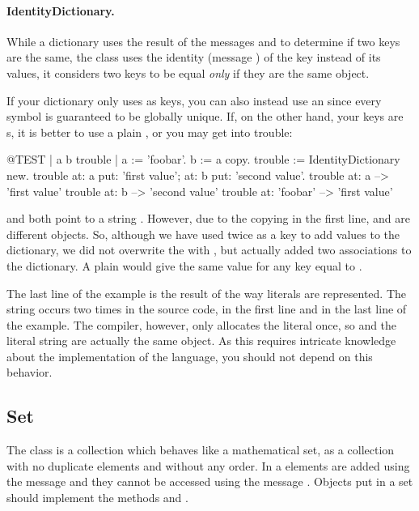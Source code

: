 \documentclass[a4paper,10pt,twoside]{book}
\begin{document}
\paragraph{IdentityDictionary.}
While a dictionary uses the result of the messages \ct{=} and  to determine if two keys are the same, the class  uses the identity (message ) of the key instead of its values, \ie it considers two keys to be equal \emph{only} if they are the same object.

If your dictionary only uses  as keys, you can also instead use an  since every symbol is guaranteed to be globally unique.
If, on the other hand, your keys are s, it is better to use a plain , or you may get into trouble:

\begin{code}{@TEST | a b trouble |}
a := 'foobar'.
b := a copy.
trouble := IdentityDictionary new.
trouble
    at: a put: 'first value';
    at: b put: 'second value'.
trouble at: a          --> 'first value'
trouble at: b          --> 'second value'
trouble at: 'foobar' --> 'first value'
\end{code}

\noindent
{} and  both point to a string . However, due to the copying in the first line,  and  are different objects. So, although we have used  twice as a key to add values to the dictionary, we did not overwrite the  with , but actually added two associations to the dictionary.
A plain  would give the same value for any key equal to .

The last line of the example is the result of the way literals are represented. The string  occurs two times in the source code, in the first line and in the last line of the example. The compiler, however, only allocates the literal once, so  and the literal string  are actually the same object. As this requires intricate knowledge about the implementation of the language, you should not depend on this behavior.


\subsection{Set}
The class  is a collection which behaves like a mathematical set, \ie as a collection with no duplicate elements and without any order.
In a  elements are added using the message  and they cannot be accessed using the message .
Objects put in a set should implement the methods  and \ct{=}.
\end{document}
